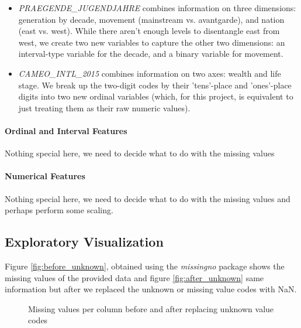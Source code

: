 \begin{itemize}
    \item \emph{PRAEGENDE\_JUGENDJAHRE} combines information on three dimensions: generation by decade, movement (mainstream vs. avantgarde), and nation (east vs. west). While there aren't enough levels to disentangle east from west, we create two new variables to capture the other two dimensions: an interval-type variable for the decade, and a binary variable for movement.
    \item \emph{CAMEO\_INTL\_2015} combines information on two axes: wealth and life stage. We break up the two-digit codes by their 'tens'-place and 'ones'-place digits into two new ordinal variables (which, for this project, is equivalent to just treating them as their raw numeric values).
\end{itemize}

\paragraph{Ordinal and Interval Features}
Nothing special here, we need to decide what to do with the missing values

\paragraph{Numerical Features}
Nothing special here, we need to decide what to do with the missing values and perhaps perform some scaling.

\subsection{Exploratory Visualization}

Figure \ref{fig:before_unknown}, obtained using the \emph{missingno} package shows the missing values of the provided data and figure \ref{fig:after_unknown} same information but after we replaced the unknown or missing value codes with NaN.

\begin{figure}[h]
  \centering
  \hfill
  \caption{Missing values per column before and after replacing unknown value codes}
\end{figure}

